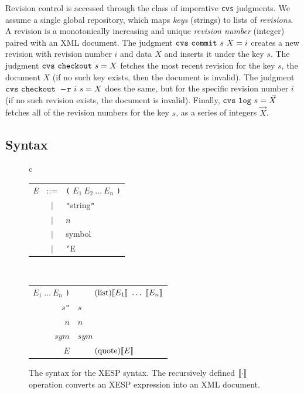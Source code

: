 \documentclass[twocolumn]{article}
\begin{document}
Revision control is accessed through the class of imperative {\tt cvs}
judgments. We assume a single global repository, which maps {\em keys}
(strings) to lists of {\em revisions}. A revision is a monotonically
increasing and unique {\em revision number} (integer) paired with an
XML document. The judgment ${\tt cvs\ commit}\ s\ X = i$ creates a new
revision with revision number $i$ and data $X$ and inserts it under
the key $s$. The judgment ${\tt cvs\ checkout}\ s = X$ fetches the
most recent revision for the key $s$,\z{} the
document $X$ (if no such key exists, then the document is invalid).
The judgment ${\tt cvs\ checkout\ -\!r}\ i\ s = X$ does the same, but
for the specific revision number $i$ (if no such
revision exists, the document is invalid). Finally, ${\tt cvs\ log}\ s
= \vec{X}$ fetches all of the revision numbers for the key $s$, as a
series of integers $\vec{X}$.

\subsection{Syntax}

\begin{figure}[htb]
\begin{center}
\begin{tabular}{c}
  \begin{tabular}{rcl}
   {\em E} & ::= & {\tt(} $E_1\ E_2\ \ldots\ E_n$ {\tt)} \\
           & $|$ & {\tt"}string{\tt"} \\
           & $|$ & $n$ \\
           & $|$ & symbol \\
           & $|$ & {\tt'}E \\
  \end{tabular} \\[3em]

  \begin{tabular}{r@{\,\,=\,\,}l}
   \lb {\tt(} $E_1\ \ldots\ E_n$ {\tt)}\rb & $\tag{list}{ \lb E_1 \rb\ \ldots\ \lb E_n \rb}$ \\
   \lb {\tt"}$s${\tt"}\rb & $\tag{string}{s}$ \\
   \lb $n$\rb & $\tag{int}{n}$ \\
   \lb $sym$\rb & $\tag{symbol}{sym}$ \\
   \lb {\tt'}$E$\rb & $\tag{quote}{\lb E\rb}$ \\
  \end{tabular}

\end{tabular}
\end{center}
\caption{The syntax for the XESP syntax. The recursively defined $[\![
\cdot ]\!]$ operation converts an XESP expression into an XML
document.} \label{fig:xesp}
\end{figure}
\end{document}

